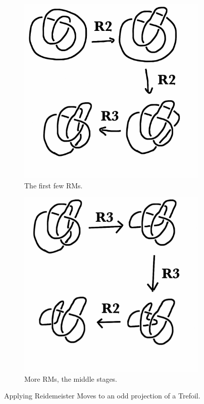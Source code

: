 \documentclass[12pt,letterpaper]{article}
\theoremstyle{definition}
\begin{document}
\begin{figure}[h]
    \centering
    \begin{subfigure}{.4\textwidth}
        \centering
        \includegraphics[width=\textwidth]{rgp06pics/trefoil-better1.png}
        \caption{The first few RMs.}
    \end{subfigure}
    \hspace{2cm}
    \begin{subfigure}{.4\textwidth}
        \centering
        \includegraphics[width=\textwidth]{rgp06pics/trefoil-better2.png}
        \caption{More RMs, the middle stages.}
     \end{subfigure}
     \caption{Applying Reidemeister Moves to an odd projection of a Trefoil.}
\end{figure}
\end{document}
